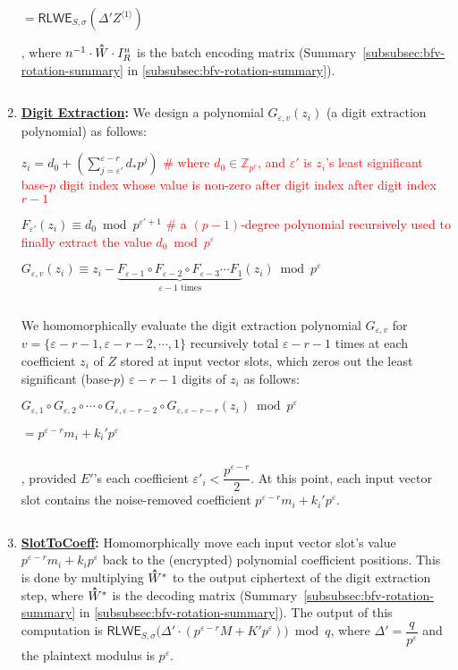 \begin{tcolorbox}[title={\textbf{\tboxlabel{\ref*{subsubsec:bfv-bootstrapping-summary}} BFV Bootstrapping}}]
\begin{enumerate}
$= \textsf{RLWE}_{S, \sigma}(\Delta' Z^{\langle1\rangle})$

, where $n^{-1}\cdot \hathat{W}\cdot I_R^n$ is the batch encoding matrix (Summary~\ref*{subsubsec:bfv-rotation-summary} in \autoref{subsubsec:bfv-rotation-summary}). 

$ $

\item \textbf{\underline{Digit Extraction}:} We design a polynomial $G_{\varepsilon,v}(z_i)$ (a digit extraction polynomial) as follows:

$z_i = d_0 + \left(\sum\limits_{j=\varepsilon'}^{\varepsilon-r} d_* p^j\right)$ \textcolor{red}{ \# where $d_0 \in \mathbb{Z}_{p^r}$, and $\varepsilon'$ is $z_i$'s least significant base-$p$ digit index whose value is non-zero after digit index after digit index $r-1$}

$F_{\varepsilon'}(z_i) \equiv d_0 \bmod p^{\varepsilon'+1}$ \textcolor{red}{ \# a $(p-1)$-degree polynomial recursively used to finally extract the value $d_0 \bmod p^{\varepsilon}$}

$G_{\varepsilon,v}(z_i) \equiv z_i - \underbrace{F_{\varepsilon-1} \circ F_{\varepsilon-2} \circ F_{\varepsilon-3} \cdots F_{1}}_{\varepsilon - 1 \text{ times}} (z_i) \bmod p^\varepsilon$

$ $

We homomorphically evaluate the digit extraction polynomial $G_{\varepsilon,v}$ for $v = \{\varepsilon-r-1, \varepsilon-r-2, \cdots, 1\}$ recursively total $\varepsilon-r-1$ times at each coefficient $z_i$ of $Z$ stored at input vector slots, which zeros out the least significant (base-$p$) $\varepsilon-r-1$ digits of $z_i$ as follows:

$G_{\varepsilon,1} \circ G_{\varepsilon,2} \circ \cdots \circ G_{\varepsilon,\varepsilon-r-2} \circ G_{\varepsilon,\varepsilon-r-r} (z_i) \bmod p^\varepsilon$

$= p^{\varepsilon-r}m_i + k_i'p^\varepsilon$

$ $

, provided $E'$'s each coefficient $\varepsilon'_i < \dfrac{p^{\varepsilon-r}}{2}$. At this point, each input vector slot contains the noise-removed coefficient $p^{\varepsilon-r}m_i + k_i'p^\varepsilon$. 

$ $

\item \textbf{\textsf{\underline{SlotToCoeff}}:} Homomorphically move each input vector slot's value $p^{\varepsilon-r}m_i + k_ip^\varepsilon$ back to the (encrypted) polynomial coefficient positions. This is done by multiplying $\hathat W^*$ to the output ciphertext of the digit extraction step, where $\hathat{W}^*$ is the decoding matrix (Summary~\ref*{subsubsec:bfv-rotation-summary} in \autoref{subsubsec:bfv-rotation-summary}). The output of this computation is $\textsf{RLWE}_{S, \sigma}\bm(\Delta'\cdot (p^{\varepsilon-r}M + K'p^\varepsilon) \bm) \bmod q$, where $\Delta' = \dfrac{q}{p^\varepsilon}$ and the plaintext modulus is $p^\varepsilon$. 


\end{enumerate}
\end{tcolorbox}
